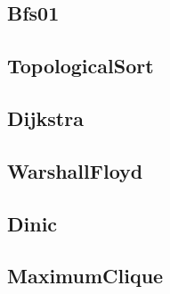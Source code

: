 \documentclass[titlepage, landscape, a4paper, twocolumn, 10pt]{ujarticle}
\begin{document}
\subsection{Bfs01}


\subsection{TopologicalSort}


\subsection{Dijkstra}


\subsection{WarshallFloyd}


\subsection{Dinic}


\subsection{MaximumClique}

\end{document}
